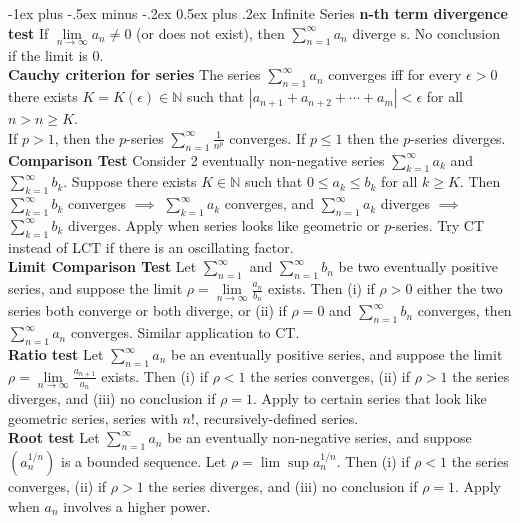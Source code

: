 \documentclass[10pt,landscape]{article}
\makeatletter
\renewcommand{\section}{\@startsection{section}{1}{0mm}%
                                {-1ex plus -.5ex minus -.2ex}%
                                {0.5ex plus .2ex}%
                                {\normalfont\large\bfseries}}
\makeatother
\begin{document}
\begin{multicols}{3}
\section{Infinite Series}
\textbf{n-th term divergence test} If $\lim\limits_{n\to\infty}a_n\neq 0$ (or does not exist), then  $\sum_{n=1}^\infty a_n$ diverge s. No conclusion if the limit is $0$.\\
\textbf{Cauchy criterion for series} The series $\sum_{n=1}^\infty a_n$ converges iff for every  $\epsilon>0$ there exists  $K=K(\epsilon)\in\mathbb{N}$ such that  $|a_{n+1}+a_{n+2}+\cdots+a_m|<\epsilon$ for all  $n>n\geq K$.\\
If $p>1$, then the  $p$-series  $\sum_{n=1}^\infty \frac{1}{n^p}$ converges. If $p\leq 1$ then the  $p$-series diverges.\\
\textbf{Comparison Test} Consider 2 eventually non-negative series $\sum_{k=1}^\infty a_k$ and  $\sum_{k=1}^\infty b_k$. Suppose there exists  $K\in\mathbb{N}$ such that  $0\leq a_k\leq b_k$ for all  $k\geq K$. Then  $\sum_{k=1}^\infty b_k$ converges  $\implies$  $\sum_{k=1}^\infty a_k$ converges, and  $\sum_{n=1}^\infty a_k$ diverges  $\implies$  $\sum_{k=1}^\infty b_k$ diverges. Apply when series looks like geometric or $p$-series. Try CT instead of LCT if there is an oscillating factor.\\
\textbf{Limit Comparison Test} Let $\sum_{n=1}^\infty$ and $\sum_{n=1}^\infty b_n$ be two eventually positive series, and suppose the limit  $\rho=\lim\limits_{n\to\infty}\frac{a_n}{b_n}$ exists. Then (i) if $\rho>0$ either the two series both converge or both diverge, or (ii) if  $\rho=0$ and  $\sum_{n=1}^\infty b_n$ converges, then  $\sum_{n=1}^\infty a_n$ converges. Similar application to CT.\\
\textbf{Ratio test} Let $\sum_{n=1}^\infty a_n$ be an eventually positive series, and suppose the limit $\rho=\lim\limits_{n\to\infty}\frac{a_{n+1}}{a_n}$ exists. Then (i) if $\rho<1$ the series converges, (ii) if  $\rho>1$ the series diverges, and (iii) no conclusion if  $\rho=1$. Apply to certain series that look like geometric series, series with $n!$, recursively-defined series.\\
\textbf{Root test} Let  $\sum_{n=1}^\infty a_n$ be an eventually non-negative series, and suppose  $(a_n^{1/n})$ is a bounded sequence. Let $\rho=\lim\sup a_n^{1/n}$. Then (i) if $\rho<1$ the series converges, (ii) if  $\rho>1$ the series diverges, and (iii) no conclusion if  $\rho=1$. Apply when $a_n$ involves a higher power.\\

\end{multicols}
\end{document}

